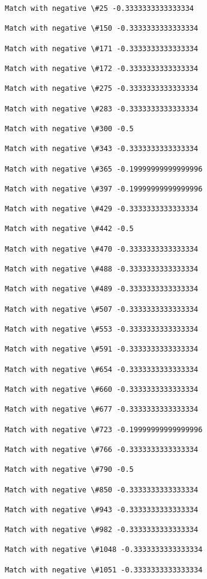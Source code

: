 \documentclass[11pt]{article}
\begin{document}
    \begin{Verbatim}[commandchars=\\\{\}]
Match with negative \#25 -0.3333333333333334

Match with negative \#150 -0.3333333333333334

Match with negative \#171 -0.3333333333333334

Match with negative \#172 -0.3333333333333334

Match with negative \#275 -0.3333333333333334

Match with negative \#283 -0.3333333333333334

Match with negative \#300 -0.5

Match with negative \#343 -0.3333333333333334

Match with negative \#365 -0.19999999999999996

Match with negative \#397 -0.19999999999999996

Match with negative \#429 -0.3333333333333334

Match with negative \#442 -0.5

Match with negative \#470 -0.3333333333333334

Match with negative \#488 -0.3333333333333334

Match with negative \#489 -0.3333333333333334

Match with negative \#507 -0.3333333333333334

Match with negative \#553 -0.3333333333333334

Match with negative \#591 -0.3333333333333334

Match with negative \#654 -0.3333333333333334

Match with negative \#660 -0.3333333333333334

Match with negative \#677 -0.3333333333333334

Match with negative \#723 -0.19999999999999996

Match with negative \#766 -0.3333333333333334

Match with negative \#790 -0.5

Match with negative \#850 -0.3333333333333334

Match with negative \#943 -0.3333333333333334

Match with negative \#982 -0.3333333333333334

Match with negative \#1048 -0.3333333333333334

Match with negative \#1051 -0.3333333333333334


\end{Verbatim}
\end{document}
